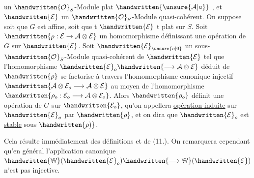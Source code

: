un $\handwritten{\mathcal{O}}_S$-Module plat $\handwritten{\unsure{\mathcal{A}|a}}$ , et $\handwritten{\mathcal{E}}$ un $\handwritten{\mathcal{O}}_S$-Module quasi-cohérent. On suppose soit que $G$ est affine, soit que t $\handwritten{\mathcal{E}}$ t plat sur $S$. Soit $\handwritten{\rho:\mathcal{E}\to\mathcal{A}\otimes\mathcal{E}}$ un homomorphisme définissant une opération de $G$ sur $\handwritten{\mathcal{E}}$. Soit $\handwritten{\mathcal{E}}_{\unsure{o|0}}$ un sous-$\handwritten{\mathcal{O}}_S$-Module quasi-cohérent de $\handwritten{\mathcal{E}}$ tel que l'homomorphisme $\handwritten{\mathcal{E}}_o\handwritten{\longrightarrow\mathcal{A}\otimes\mathcal{E}}$ déduit de $\handwritten{\rho}$ se factorise à travers l'homomorphisme canonique \handwritten{(}injectif $\handwritten{\mathcal{A}\otimes\mathcal{E}_o\longrightarrow\mathcal{A}\otimes\mathcal{E}}$ au moyen de l'homomorphisme $\handwritten{\rho_o:\mathcal{E}_o\longrightarrow\mathcal{A}\otimes\mathcal{E}_o}$. Alors $\handwritten{\rho_o}$ définit une opération de $G$ sur $\handwritten{\mathcal{E}_o}$\handwritten{(},\handwritten{\unsure{(}} qu'on appellera \uline{opération induite} sur $\handwritten{\mathcal{E}}_o$ par $\handwritten{\rho}$, et on dira que $\handwritten{\mathcal{E}}_o$ est \uline{stable} sous $\handwritten{\rho)}$.

Cela résulte immédiatement des définitions et de (11.). On remarquera cependant qu'en général l'application canonique $\handwritten{\mathbb{W}}(\handwritten{\mathcal{E}}_o)\handwritten{\longrightarrow\mathbb{W}}(\handwritten{\mathcal{E}})$ n'est pas injective.

